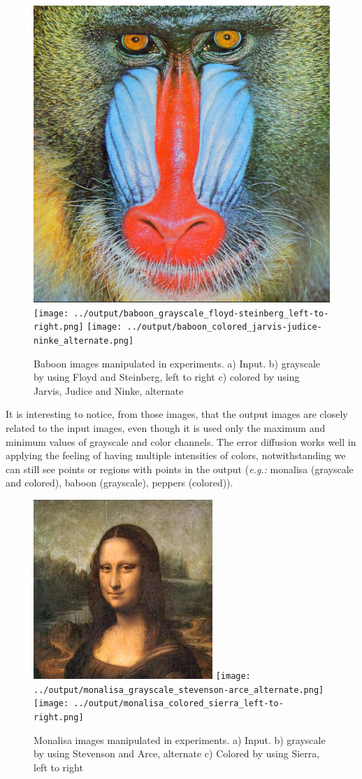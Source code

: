 \documentclass[]{IEEEtran}
\begin{document}
\begin{figure}[H]
  \centering
  \includegraphics[width=0.4\hsize]{../input/baboon_colored.png}
  \texttt{[image: ../output/baboon\_grayscale\_floyd-steinberg\_left-to-right.png]}
  \texttt{[image: ../output/baboon\_colored\_jarvis-judice-ninke\_alternate.png]}
  \caption{Baboon images manipulated in experiments. a) Input. b) grayscale by using Floyd and Steinberg, left to right c) colored by using Jarvis, Judice and Ninke, alternate}
  \label{fig:effect-baboon}
\end{figure}

It is interesting to notice, from those images, that the output images are closely related to the input images, even though it is used only the maximum and minimum values of grayscale and color channels. The error diffusion works well in applying the feeling of having multiple intensities of colors, notwithstanding we can still see points or regions with points in the output (\textit{e.g.:} monalisa (grayscale and colored), baboon (grayscale), peppers (colored)).  

\begin{figure}[H]
  \centering
  \includegraphics[width=0.4\hsize]{../input/monalisa_colored.png}
  \texttt{[image: ../output/monalisa\_grayscale\_stevenson-arce\_alternate.png]}
  \texttt{[image: ../output/monalisa\_colored\_sierra\_left-to-right.png]}
  \caption{Monalisa images manipulated in experiments. a) Input. b) grayscale by using Stevenson and Arce, alternate c) Colored by using Sierra, left to right}
  \label{fig:effect-monalisa}
\end{figure}
\end{document}
